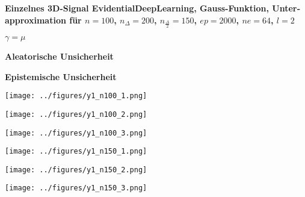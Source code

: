 \begin{otherlanguage}{ngerman}
\begin{samepage}
\begin{minipage}{\textwidth}

\noindent\textbf{Einzelnes 3D-Signal \gls{EvidentialDeepLearning}, Gauss-Funktion,
Unterapproximation für $n=100$, $n_{\Delta}=200$, $n_{\frac{\Delta}{2}}=150$, $ep=2000$, $ne=64$, $l=2$ }


\begin{minipage}{0.05\textwidth}\vspace{0.5cm}\end{minipage}%
\begin{minipage}{0.3\textwidth}\centering \textbf{$\gamma=\mu$}\end{minipage}%
\begin{minipage}{0.3\textwidth}\centering \textbf{Aleatorische Unsicherheit}\end{minipage}%
\begin{minipage}{0.3\textwidth}\centering \textbf{Epistemische Unsicherheit}\end{minipage}

\vspace{0.125cm}

\begin{minipage}{0.05\textwidth}\centering{}\end{minipage}%
\begin{minipage}{0.3\textwidth}\centering\texttt{[image: ../figures/y1\_n100\_1.png]}\end{minipage}%
\begin{minipage}{0.3\textwidth}\centering\texttt{[image: ../figures/y1\_n100\_2.png]}\end{minipage}%
\begin{minipage}{0.3\textwidth}\centering\texttt{[image: ../figures/y1\_n100\_3.png]}\end{minipage}

\vspace{0.125cm}

\begin{minipage}{0.05\textwidth}\centering{}\end{minipage}%
\begin{minipage}{0.3\textwidth}\centering\texttt{[image: ../figures/y1\_n150\_1.png]}\end{minipage}%
\begin{minipage}{0.3\textwidth}\centering\texttt{[image: ../figures/y1\_n150\_2.png]}\end{minipage}%
\begin{minipage}{0.3\textwidth}\centering\texttt{[image: ../figures/y1\_n150\_3.png]}\end{minipage}


\end{minipage}
\end{samepage}
\end{otherlanguage}
